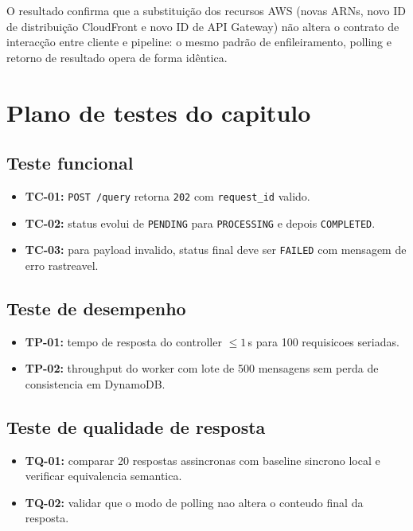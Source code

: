 O resultado confirma que a substitui\c{c}\~ao dos recursos AWS (novas ARNs,
novo ID de distribui\c{c}\~ao CloudFront e novo ID de API Gateway) n\~ao altera
o contrato de interac\c{c}\~ao entre cliente e pipeline: o mesmo padr\~ao de
enfileiramento, polling e retorno de resultado opera de forma id\^entica.

\section{Plano de testes do capitulo}

\subsection{Teste funcional}

\begin{itemize}[leftmargin=*]
  \item \textbf{TC-01:} \texttt{POST /query} retorna \texttt{202} com
        \texttt{request\_id} valido.
  \item \textbf{TC-02:} status evolui de \texttt{PENDING} para
        \texttt{PROCESSING} e depois \texttt{COMPLETED}.
  \item \textbf{TC-03:} para payload invalido, status final deve ser
        \texttt{FAILED} com mensagem de erro rastreavel.
\end{itemize}

\subsection{Teste de desempenho}

\begin{itemize}[leftmargin=*]
  \item \textbf{TP-01:} tempo de resposta do controller $\leq 1$\,s
        para 100 requisicoes seriadas.
  \item \textbf{TP-02:} throughput do worker com lote de 500 mensagens
        sem perda de consistencia em DynamoDB.
\end{itemize}

\subsection{Teste de qualidade de resposta}

\begin{itemize}[leftmargin=*]
  \item \textbf{TQ-01:} comparar 20 respostas assincronas com baseline
        sincrono local e verificar equivalencia semantica.
  \item \textbf{TQ-02:} validar que o modo de polling nao altera o
        conteudo final da resposta.
\end{itemize}

